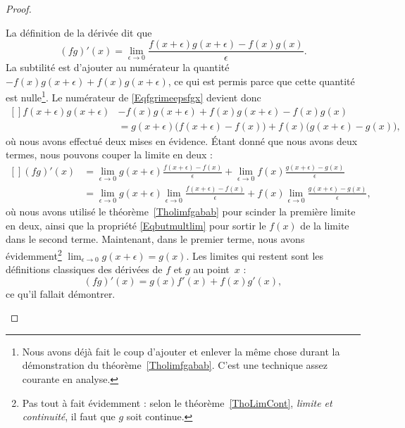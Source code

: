 \begin{proof}
\begin{subproof}
		La définition de la dérivée dit que
		\begin{equation}        \label{Eqfgrimeepsfgx}
			(fg)'(x)=\lim_{\epsilon\to 0}\frac{f(x+\epsilon)g(x+\epsilon)-f(x)g(x)}{\epsilon}.
		\end{equation}
		La subtilité est d'ajouter au numérateur la quantité \( -f(x)g(x+\epsilon)+f(x)g(x+\epsilon)\), ce qui est permis parce que cette quantité est nulle\footnote{Nous avons déjà fait le coup d'ajouter et enlever la même chose durant la démonstration du théorème~\ref{Tholimfgabab}. C'est une technique assez courante en analyse.}. Le numérateur de \eqref{Eqfgrimeepsfgx} devient donc
		\begin{equation}
			\begin{aligned}[]
				f(x+\epsilon)g(x+\epsilon) & -f(x)g(x+\epsilon)+f(x)g(x+\epsilon)-f(x)g(x)                                     \\
				                           & = g(x+\epsilon)\big( f(x+\epsilon)-f(x) \big)+f(x)\big( g(x+\epsilon)-g(x) \big),
			\end{aligned}
		\end{equation}
		où nous avons effectué deux mises en évidence. Étant donné que nous avons deux termes, nous pouvons couper la limite en deux :
		\begin{equation}
			\begin{aligned}[]
				(fg)'(x) & =\lim_{\epsilon\to 0}g(x+\epsilon)\frac{ f(x+\epsilon)-f(x) }{\epsilon}                      +  \lim_{\epsilon\to 0}f(x)\frac{ g(x+\epsilon)-g(x) }{\epsilon}    \\
				         & =\lim_{\epsilon\to 0}g(x+\epsilon)\lim_{\epsilon\to 0}\frac{ f(x+\epsilon)-f(x) }{\epsilon}  +  f(x)\lim_{\epsilon\to 0}\frac{ g(x+\epsilon)-g(x) }{\epsilon},
			\end{aligned}
		\end{equation}
		où nous avons utilisé le théorème~\ref{Tholimfgabab} pour scinder la première limite en deux, ainsi que la propriété \eqref{Eqbutmultlim} pour sortir le \( f(x)\) de la limite dans le second terme. Maintenant, dans le premier terme, nous avons évidemment\footnote{Pas tout à fait évidemment : selon le théorème~\ref{ThoLimCont}, \emph{limite et continuité}, il faut que \( g\) soit continue.} \( \lim_{\epsilon\to 0}g(x+\epsilon)=g(x)\). Les limites qui restent sont les définitions classiques des dérivées de \( f\) et \( g\) au point~\( x\) :
		\begin{equation}
			(fg)'(x)=g(x)f'(x)+f(x)g'(x),
		\end{equation}
		ce qu'il fallait démontrer.


\end{subproof}
\end{proof}
